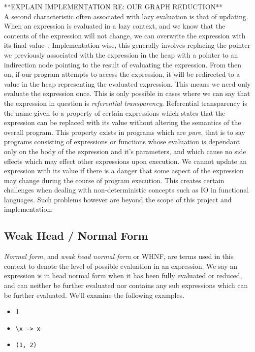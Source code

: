 **EXPLAIN IMPLEMENTATION RE: OUR GRAPH REDUCTION**  \\


A second characteristic often associated with lazy evaluation is that of 
updating. When an expression is evaluated in a lazy context, and we know
that the contents of the expression will not change, we can overwrite the
expression with its final value~\cite[pp.208]{SPJ}. Implementation wise, this generally involves
replacing the pointer we previously associated with the expression in the
heap with a pointer to an indirection node pointing to the result of 
evaluating the expression. From then on, if our program attempts to 
access the expression, it will be redirected to a value in the heap 
representing the evaluated expression. This means we need only evaluate
the expression once. This is only possible in cases where
we can say that the expression in question is \emph{referential transparency}. 
Referential transparency is the name
given to a property of certain expressions which states that the expression
can be replaced with its value without altering the semantics of the overall
program. This property exists in programs which are \emph{pure}, that is to
say programs consisting of expressions or functions whose evaluation is 
dependant only on the body of the expression and it's parameters, and which
cause no side effects which may effect other expressions upon execution. 
We cannot update an expression with its value if there is a danger that
some aspect of the expression may change during the course of program 
execution. This creates certain challenges when dealing with non-deterministic
concepts such as IO in functional languages. Such problems however are 
beyond the scope of this project and implementation.

\subsection{Weak Head / Normal Form}
\emph{Normal form}, and \emph{weak head normal form} or WHNF, are terms used
in this context to denote the level of possible evaluation in an expression.
We say an expression is in head normal form when it has been fully evaluated
or reduced, and can neither be further evaluated nor contains any sub
expressions which can be further evaluated. We'll examine the following examples.

\begin{itemize}
 \item 1
 \item \verb!\x -> x!
 \item \verb!(1, 2)!
\end{itemize}

